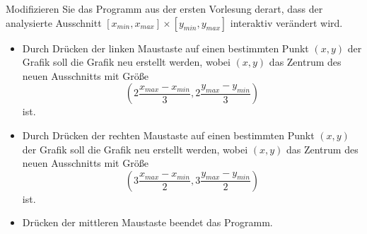 \begin{aufg}[0]
Modifizieren Sie das Programm  aus der ersten Vorlesung derart,
dass der analysierte Ausschnitt $[x_{min},x_{max}]\times [y_{min},y_{max}]$
interaktiv verändert wird. 
\begin{itemize}
\item Durch Drücken der
linken Maustaste auf einen bestimmten Punkt $(x,y)$ der Grafik soll  die Grafik neu
erstellt werden, wobei $(x,y)$ das Zentrum des neuen Ausschnitts mit
Gr\"o{\ss}e 
\[ \left (  2\frac{x_{max}-x_{min}}{3},  2\frac{y_{max}-y_{min}}{3} \right)\]
ist.
\item Durch Drücken der
rechten Maustaste auf einen bestimmten Punkt $(x,y)$ der Grafik soll  die Grafik neu
erstellt werden, wobei $(x,y)$ das Zentrum des neuen Ausschnitts mit
Gr\"o{\ss}e 
\[ \left (  3\frac{x_{max}-x_{min}}{2},  3\frac{y_{max}-y_{min}}{2} \right)\]
ist.
\item Drücken der mittleren Maustaste beendet das Programm. 
\end{itemize} 
\end{aufg}